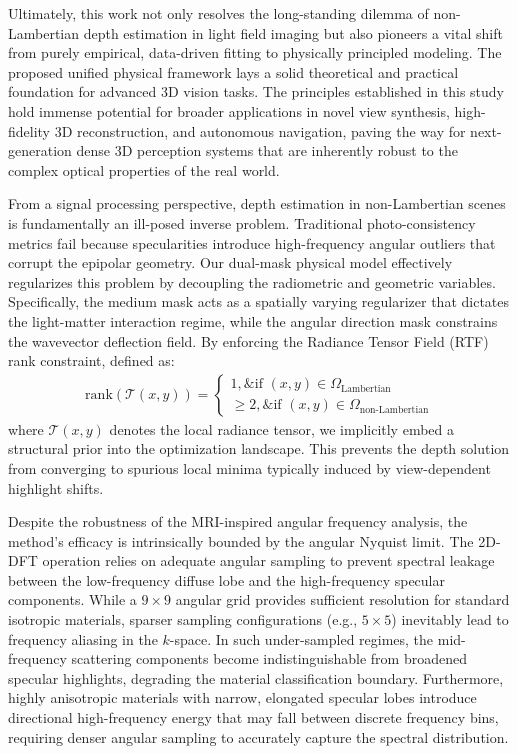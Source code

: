 Ultimately, this work not only resolves the long-standing dilemma of non-Lambertian depth estimation in light field imaging but also pioneers a vital shift from purely empirical, data-driven fitting to physically principled modeling. The proposed unified physical framework lays a solid theoretical and practical foundation for advanced 3D vision tasks. The principles established in this study hold immense potential for broader applications in novel view synthesis, high-fidelity 3D reconstruction, and autonomous navigation, paving the way for next-generation dense 3D perception systems that are inherently robust to the complex optical properties of the real world.


From a signal processing perspective, depth estimation in non-Lambertian scenes is fundamentally an ill-posed inverse problem. Traditional photo-consistency metrics fail because specularities introduce high-frequency angular outliers that corrupt the epipolar geometry. Our dual-mask physical model effectively regularizes this problem by decoupling the radiometric and geometric variables. Specifically, the medium mask acts as a spatially varying regularizer that dictates the light-matter interaction regime, while the angular direction mask constrains the wavevector deflection field. By enforcing the Radiance Tensor Field (RTF) rank constraint, defined as:
\begin{align*}
\text{rank}(\mathcal{T}(x, y)) = \begin{cases} 1, \& \text{if } (x, y) \in \Omega_{\text{Lambertian}} \\ \ge 2, \& \text{if } (x, y) \in \Omega_{\text{non-Lambertian}} \end{cases}
\end{align*}
where \(\mathcal{T}(x, y)\) denotes the local radiance tensor, we implicitly embed a structural prior into the optimization landscape. This prevents the depth solution from converging to spurious local minima typically induced by view-dependent highlight shifts.

Despite the robustness of the MRI-inspired angular frequency analysis, the method's efficacy is intrinsically bounded by the angular Nyquist limit. The 2D-DFT operation relies on adequate angular sampling to prevent spectral leakage between the low-frequency diffuse lobe and the high-frequency specular components. While a \(9 \times 9\) angular grid provides sufficient resolution for standard isotropic materials, sparser sampling configurations (e.g., \(5 \times 5\)) inevitably lead to frequency aliasing in the \(k\)-space. In such under-sampled regimes, the mid-frequency scattering components become indistinguishable from broadened specular highlights, degrading the material classification boundary. Furthermore, highly anisotropic materials with narrow, elongated specular lobes introduce directional high-frequency energy that may fall between discrete frequency bins, requiring denser angular sampling to accurately capture the spectral distribution.

